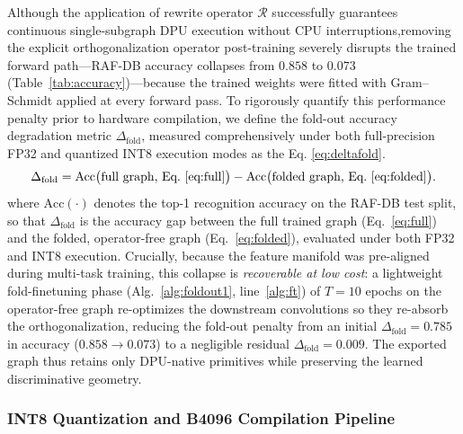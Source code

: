 \documentclass[algorithms,article,submit,moreauthors]{Definitions/mdpi}
\newcommand{\rev}[1]{\textcolor{revcolor}{#1}}
\begin{document}
Although the application of rewrite operator $\mathcal{R}$ successfully guarantees continuous single-subgraph DPU execution without CPU interruptions,\rev{removing the explicit orthogonalization operator post-training severely disrupts the trained forward path---RAF-DB accuracy collapses from $0.858$ to $0.073$ (Table~\ref{tab:accuracy})---because the trained weights were fitted with Gram--Schmidt applied at every forward pass.}
To rigorously quantify this performance penalty prior to hardware compilation, we define the fold-out accuracy degradation metric $\Delta_{\mathrm{fold}}$, measured comprehensively under both full-precision FP32 and quantized INT8 execution modes as the Eq. \eqref{eq:deltafold}.
\begin{equation}
\Delta_{\mathrm{fold}} = \mathrm{Acc}\big(\text{full graph, Eq.~\eqref{eq:full}}\big)
- \mathrm{Acc}\big(\text{folded graph, Eq.~\eqref{eq:folded}}\big).
\label{eq:deltafold}
\end{equation}
\rev{where $\mathrm{Acc}(\cdot)$ denotes the top-1 recognition accuracy on the RAF-DB test split, so that $\Delta_{\mathrm{fold}}$ is the accuracy gap between the full trained graph (Eq.~\eqref{eq:full}) and the folded, operator-free graph (Eq.~\eqref{eq:folded}), evaluated under both FP32 and INT8 execution.}
\rev{
Crucially, because the feature manifold was pre-aligned during multi-task training, this collapse is \emph{recoverable at low cost}: a lightweight fold-finetuning phase (Alg.~\ref{alg:foldout1}, line~\ref{alg:ft}) of $T=10$ epochs on the operator-free graph re-optimizes the downstream convolutions so they re-absorb the orthogonalization, reducing the fold-out penalty from an initial $\Delta_{\mathrm{fold}}=0.785$ in accuracy ($0.858\!\rightarrow\!0.073$) to a negligible residual $\Delta_{\mathrm{fold}}=0.009$. The exported graph thus retains only DPU-native primitives while preserving the learned discriminative geometry.}

\subsubsection{INT8 Quantization and B4096 Compilation Pipeline}\label{sec:quant}
\end{document}
